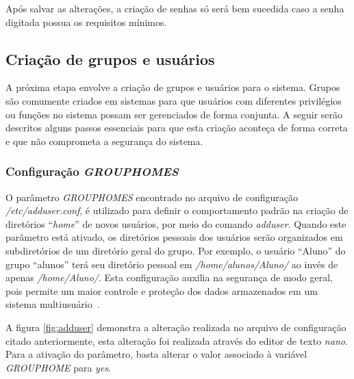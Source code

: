 \documentclass[
    12pt,				%
    oneside,   	        %
    a4paper,			%
    english,			%
    french,				%
    spanish,			%
    brazil,				%
    ]{pacotes/abntex2}
\begin{document}
Após salvar as alterações, a criação de senhas só será bem sucedida caso a senha digitada possua os requisitos mínimos.

\subsection{Criação de grupos e usuários}
\label{subsec:grupos_usuarios}

A próxima etapa envolve a criação de grupos e usuários para o sistema. Grupos são comumente criados em sistemas para que usuários com diferentes privilégios ou funções no sistema possam ser gerenciados de forma conjunta. A seguir serão descritos alguns passos essenciais para que esta criação aconteça de forma correta e que não comprometa a segurança do sistema.

\subsubsection{Configuração \textit{GROUPHOMES}}
O parâmetro \textit{GROUPHOMES} encontrado no arquivo de configuração \textit{/etc/adduser.conf}, é utilizado para definir o comportamento padrão na criação de diretórios ``\textit{home}'' de novos usuários, por meio do comando \textit{adduser}. Quando este parâmetro está ativado, os diretórios pessoais dos usuários serão organizados em subdiretórios de um diretório geral do grupo. Por exemplo, o usuário ``Aluno'' do grupo ``alunos'' terá seu diretório pessoal em \textit{/home/alunos/Aluno/} ao invés de apenas \textit{/home/Aluno/}. Esta configuração auxilia na segurança de modo geral, pois permite um maior controle e proteção dos dados armazenados em um sistema multiusuário~\cite{guiafocaSegurança}.

A figura \ref{fig:adduser} demonstra a alteração realizada no arquivo de configuração citado anteriormente, esta alteração foi realizada através do editor de texto \textit{nano}. Para a ativação do parâmetro, basta alterar o valor associado à variável \textit{GROUPHOME} para \textit{yes}.
\end{document}
